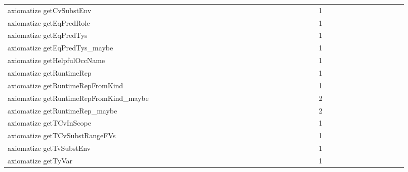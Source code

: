 {\begin{tabular}{l|rrr|rrr|rrr}
axiomatize getCvSubstEnv &  &  &  &  &  &  &  &  &  &  &  &  &  &  &  &  &  &  &  &  &  &  &  & 1 &  &  &  &  &  &  &  &  &  &  &  & \\
axiomatize getEqPredRole &  &  &  &  &  &  &  &  &  &  &  &  &  &  &  &  &  &  &  &  &  &  &  & 1 &  &  &  &  &  &  &  &  &  &  &  & \\
axiomatize getEqPredTys &  &  &  &  &  &  &  &  &  &  &  &  &  &  &  &  &  &  &  &  &  &  &  & 1 &  &  &  &  &  &  &  &  &  &  &  & \\
axiomatize getEqPredTys_maybe &  &  &  &  &  &  &  &  &  &  &  &  &  &  &  &  &  &  &  &  &  &  &  & 1 &  &  &  &  &  &  &  &  &  &  &  & \\
axiomatize getHelpfulOccName &  &  &  &  &  &  &  &  &  &  &  &  &  &  &  &  &  &  &  &  &  &  &  & 1 &  &  &  &  &  &  &  &  &  &  &  & \\
axiomatize getRuntimeRep &  &  &  &  &  &  &  &  &  &  &  &  &  &  &  &  &  &  &  &  &  &  &  & 1 &  &  &  &  &  &  &  &  &  &  &  & \\
axiomatize getRuntimeRepFromKind &  &  &  &  &  &  &  &  &  &  &  &  &  &  &  &  &  &  &  &  &  &  &  & 1 &  &  &  &  &  &  &  &  &  &  &  & \\
axiomatize getRuntimeRepFromKind_maybe &  &  &  &  &  &  &  &  &  &  &  &  &  &  &  &  &  &  &  &  &  &  &  & 2 &  &  &  &  &  &  &  &  &  &  &  & \\
axiomatize getRuntimeRep_maybe &  &  &  &  &  &  &  &  &  &  &  &  &  &  &  &  &  &  &  &  &  &  &  & 2 &  &  &  &  &  &  &  &  &  &  &  & \\
axiomatize getTCvInScope &  &  &  &  &  &  &  &  &  &  &  &  &  &  &  &  &  &  &  &  &  &  &  & 1 &  &  &  &  &  &  &  &  &  &  &  & \\
axiomatize getTCvSubstRangeFVs &  &  &  &  &  &  &  &  &  &  &  &  &  &  &  &  &  &  &  &  &  &  &  & 1 &  &  &  &  &  &  &  &  &  &  &  & \\
axiomatize getTvSubstEnv &  &  &  &  &  &  &  &  &  &  &  &  &  &  &  &  &  &  &  &  &  &  &  & 1 &  &  &  &  &  &  &  &  &  &  &  & \\
axiomatize getTyVar &  &  &  &  &  &  &  &  &  &  &  &  &  &  &  &  &  &  &  &  &  &  &  & 1 &  &  &  &  &  &  &  &  &  &  &  & \\

\end{tabular}}

